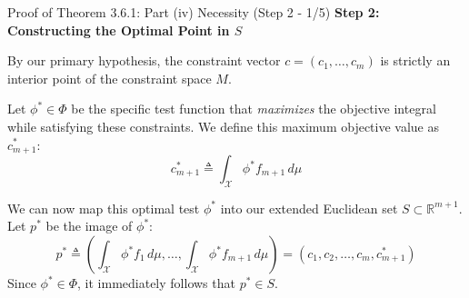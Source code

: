 \documentclass[10pt, aspectratio=169, xcolor=dvipsnames]{beamer}
\newcommand{\lead}[1]{{\color{UniBlue}\bfseries #1}}
\begin{document}
\begin{frame}{Proof of Theorem 3.6.1: Part (iv) Necessity (Step 2 - 1/5)}
    \lead{Step 2: Constructing the Optimal Point in $S$}\\
    \vspace{0.4cm}
    
    By our primary hypothesis, the constraint vector $c = (c_1, \dots, c_m)$ is strictly an interior point of the constraint space $M$.
    
    \vspace{0.4cm}
    Let $\phi^* \in \Phi$ be the specific test function that \textit{maximizes} the objective integral while satisfying these constraints. We define this maximum objective value as $c^*_{m+1}$:
    \[ c^*_{m+1} \triangleq \int_{\mathcal{X}} \phi^* f_{m+1} \, d\mu \]
    
    We can now map this optimal test $\phi^*$ into our extended Euclidean set $S \subset \mathbb{R}^{m+1}$. Let $p^*$ be the image of $\phi^*$:
    \[ p^* \triangleq \left( \int_{\mathcal{X}} \phi^* f_1 \, d\mu, \dots, \int_{\mathcal{X}} \phi^* f_{m+1} \, d\mu \right) = (c_1, c_2, \dots, c_m, c^*_{m+1}) \]
    Since $\phi^* \in \Phi$, it immediately follows that $p^* \in S$.
\end{frame}
\end{document}
